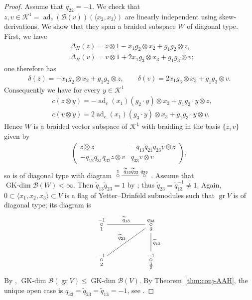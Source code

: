 \documentclass[10pt,a4paper]{amsart}
\numberwithin{equation}{section}
\newcommand{\adc}{\operatorname{ad}_c}
\newcommand{\GK}{\operatorname{GK-dim}}
\newcommand{\gr}{\operatorname{gr}}
\newcommand{\toba}{\mathscr B}
\newcommand{\K}{{\mathcal{K}}}
\newcommand{\tresdos}{\frac{3}{2}}
\begin{document}
\begin{proof}
Assume that $q_{22} = -1$.
We check that $z, v \in \K^1 = \adc(\toba(v))(\langle x_2, x_3 \rangle)$ are linearly independent using skew-derivations.
We show that they span a braided subspace $W$ of diagonal type. First, we have
\begin{align*}
&\Delta_{H}(z) = z \otimes 1 - x_1 g_2 \otimes x_2 + g_1g_2 \otimes z , \\
&\Delta_{H}(v) = v \otimes 1 + 2 x_1 g_3 \otimes x_3 + g_1g_3 \otimes v;
\end{align*}
one therefore has
\begin{align*}
\delta(z) = - x_1 g_2 \otimes x_2 + g_1g_2 \otimes z, \qquad
\delta(v) = 2 x_1 g_3 \otimes x_3 + g_1g_3 \otimes v.
\end{align*}
Consequently we have for every $y \in \K^1$
\begin{align*}
&c(z \otimes y) = -\adc(x_1)(g_2 \cdot y) \otimes x_2 + g_1g_2 \cdot y \otimes z, \\
&c(v \otimes y) = 2\adc(x_1)(g_3 \cdot y) \otimes x_3 + g_1g_3 \cdot y \otimes v.
\end{align*}
Hence $W$ is a braided vector subspace of $\K^1$ with braiding in the basis $\{z, v \}$ given by
\begin{align*}
\begin{pmatrix}
z \otimes z & -q_{13}q_{21}q_{23} v \otimes z \\
-q_{12}q_{31}q_{32} z \otimes v & q_{33} v \otimes v
\end{pmatrix}\!,
\end{align*}
so is of diagonal type with diagram $\xymatrix{
\overset{1}{\circ} \ar @{-}[r]^{\widetilde{q}_{13}\widetilde{q}_{23}} & \overset{q_{33}}{\circ} }$.
Assume that $\GK \toba(W) < \infty$.
Then $\widetilde{q}_{13}\widetilde{q}_{23} = 1$ by \cite[Lemma~2.3.7]{AAH-triang}; thus $\widetilde{q}_{23} = \widetilde{q}_{13}^{-1} \neq 1$.
Again, $0 \subset \langle x_1, x_2, x_3\rangle \subset V$ is a flag of Yetter--Drinfeld submodules such that $\gr V$ is of diagonal type; its diagram is
$$
\xymatrix{
\overset{-1}{\underset{1} {\circ}}\ar @{-}[rr]^{\widetilde{q}_{13}} & & \overset{q_{33}} {\underset{3} {\circ}}
\ar @{-}[d]^{\widetilde{q}_{13}} \ar @{-}[dll]_{\widetilde{q}_{23}} \\
\overset{-1}{\underset{2} {\circ}} && \overset{-1}{\underset{\tresdos} {\circ}} }
$$
By \cite[Lemma 3.4.2\,(c)]{AAH-triang}, $\GK \toba(\gr V)\le \GK \toba(V)$.
By Theorem~\ref{thm:conj-AAH}, the unique open case is $q_{33}=\widetilde{q}_{23} = \widetilde{q}_{13} = -1$, see \cite{H-classif-RS}.


\end{proof}
\end{document}
